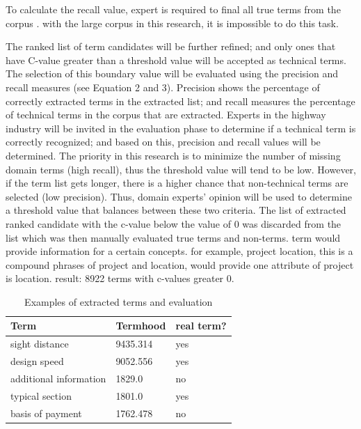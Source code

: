 \documentclass[Journal, InsideFigs, DoubleSpace]{ascelike} %
\begin{document}
\par
To calculate the recall value, expert is required to final all true terms from the corpus \cite{frantzi20}. with the large corpus in this research, it is impossible to do this task. 
\par
The ranked list of term candidates will be further refined; and only ones that have C-value greater than a threshold value will be accepted as technical terms. The selection of this boundary value will be evaluated using the precision and recall measures (see Equation 2 and 3). Precision shows the percentage of correctly extracted terms in the extracted list; and recall measures the percentage of technical terms in the corpus that are extracted. Experts in the highway industry will be invited in the evaluation phase to determine if a technical term is correctly recognized; and based on this, precision and recall values will be determined. The priority in this research is to minimize the number of missing domain terms (high recall), thus the threshold value will tend to be low. However, if the term list gets longer, there is a higher chance that non-technical terms are selected (low precision). Thus, domain experts’ opinion will be used to determine a threshold value that balances between these two criteria. 
%
The list of extracted ranked candidate with the c-value below the value of 0 was discarded from the list which was then manually evaluated true terms and non-terms. term would provide information for a certain concepts. for example, project location, this is a compound phrases of project and location, would provide one attribute of project is location. 
%
result: 8922 terms with c-values greater 0. 
\begin{table} [t]
	\caption{Examples of extracted terms and evaluation}
	\label{table:term_evaluation}
	\centering
	\small
	\renewcommand{\arraystretch}{1.25}
	\begin{tabular}{l l l}
		\hline
		\textbf{Term} & \textbf{Termhood} & \textbf{real term?}\\
		\hline
		sight distance		& 9435.314 & yes\\
		design speed & 9052.556 & yes \\
		additional information & 1829.0 & no\\
		typical section & 1801.0  & yes\\
		basis of payment & 1762.478 & no\\
		\hline
	\end{tabular}
	
	\normalsize
\end{table}
\end{document}
